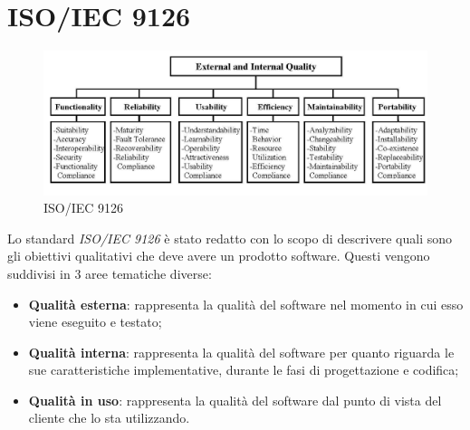 \newpage
\section{ISO/IEC 9126}

\label{PDCA}
\begin{figure}[h]
\centering
\includegraphics[scale=0.3,keepaspectratio]{9126.png}
\caption{ISO/IEC 9126}
\end{figure}
\FloatBarrier

Lo standard \textit{ISO/IEC 9126} è stato redatto con lo scopo di descrivere quali sono gli obiettivi qualitativi che deve avere un prodotto software. Questi vengono suddivisi in 3 aree tematiche diverse:
\begin{itemize}
\item\textbf{Qualità esterna}: rappresenta la qualità del software nel momento in cui esso viene eseguito e testato;
\item\textbf{Qualità interna}: rappresenta la qualità del software per quanto riguarda le sue caratteristiche implementative, durante le fasi di progettazione e codifica; 
\item\textbf{Qualità in uso}: rappresenta la qualità del software dal punto di vista del cliente che lo sta utilizzando.
\end{itemize}

